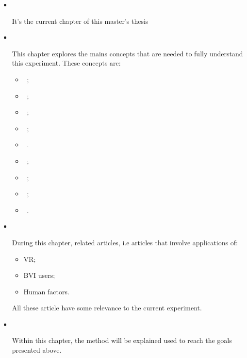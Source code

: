 \begin{itemize}
    \item {\large\textbf{{~}}}
        
        It's the current chapter of this master's thesis
    
    \item {\large\textbf{{~}}}
    
        This chapter explores the mains concepts that are needed to fully understand this experiment. These concepts are:
        
        \begin{itemize}
            \item {~};
            \item {~};
            \item {~};
            \item {~};
            \item {~}.
            \item {~};
            \item {~};
            \item {~};
            \item {~}.
            
        \end{itemize}
    
    \item {\large\textbf{{~}}}
    
        During this chapter, related articles, i.e articles that involve applications of:
        \begin{itemize}
            \item VR;
            \item BVI users;
            \item Human factors.
        \end{itemize}
        All these article have some relevance to the current experiment.
    
    \item {\large\textbf{{~}}}
    
        Within this chapter, the method will be explained used to reach the goals presented above.
    

\end{itemize}
